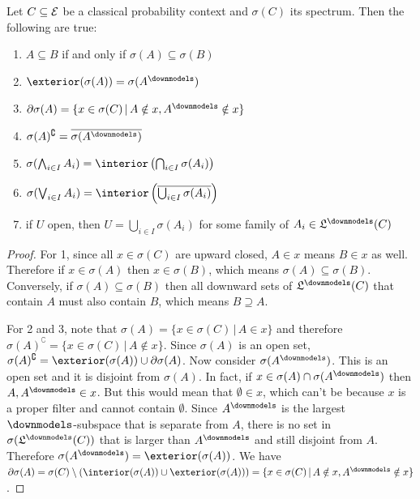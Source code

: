 \begin{mathSection}
	\begin{prop}
		Let $C \subseteq \mathcal{E}$ be a classical probability context and $\sigma(C)$ its spectrum. Then the following are true:
		\begin{enumerate}
			\item $A \subseteq B$ if and only if $\sigma(A) \subseteq \sigma(B)$
			\item $\exterior(\sigma(A)) = \sigma(A^{\separate})$
			\item $\partial \sigma(A) = \{ x \in \sigma(C) \, | \, A \notin x, A^{\separate} \notin x \}$
			\item $\sigma(A)^{\complement} = \overline{\sigma(A^{\separate})}$
			\item $\sigma(\bigwedge_{i \in I} A_i) = \interior\left(\bigcap_{i \in I} \sigma(A_i)\right)$
			\item $\sigma(\bigvee_{i \in I} A_i) = \interior\left(\overline{\bigcup_{i \in I} \sigma(A_i)}\right)$
			\item if $U$ open, then $U = \bigcup_{i \in I} \sigma(A_i)$ for some family of $A_i \in \mathfrak{L}^\separate(C)$
		\end{enumerate}
	\end{prop}
	
	\begin{proof}
		For 1, since all $x \in \sigma(C)$ are upward closed, $A \in x$ means $B \in x$ as well. Therefore if $x \in \sigma(A)$ then $x \in \sigma(B)$, which means $\sigma(A) \subseteq \sigma(B)$. Conversely, if $\sigma(A) \subseteq \sigma(B)$ then all downward sets of $\mathfrak{L}^\separate(C)$ that contain $A$ must also contain $B$, which means $B \supseteq A$.
		
		For 2 and 3, note that $\sigma(A) = \{ x \in \sigma(C) \, | \, A \in x \}$ and therefore $\sigma(A)^{\complement} = \{ x \in \sigma(C) \, | \, A \notin x \}$. Since $\sigma(A)$ is an open set, $\sigma(A)^{\complement} = \exterior(\sigma(A)) \cup \partial \sigma(A)$. Now consider $\sigma(A^{\separate})$. This is an open set and it is disjoint from $\sigma(A)$. In fact, if $x \in \sigma(A) \cap \sigma(A^{\separate})$ then $A, A^{\separate} \in x$. But this would mean that $\emptyset \in x$, which can't be because $x$ is a proper filter and cannot contain $\emptyset$. Since $A^{\separate}$ is the largest $\separate$-subspace that is separate from $A$, there is no set in $\sigma(\mathfrak{L}^\separate(C))$ that is larger than $A^{\separate}$ and still disjoint from $A$. Therefore $\sigma(A^{\separate}) = \exterior(\sigma(A))$. We have $\partial \sigma(A) = \sigma(C) \setminus (\interior(\sigma(A))\cup\exterior(\sigma(A))) = \{ x \in \sigma(C) \, | \, A \notin x, A^{\separate} \notin x \}$.
		

\end{proof}
\end{mathSection}
